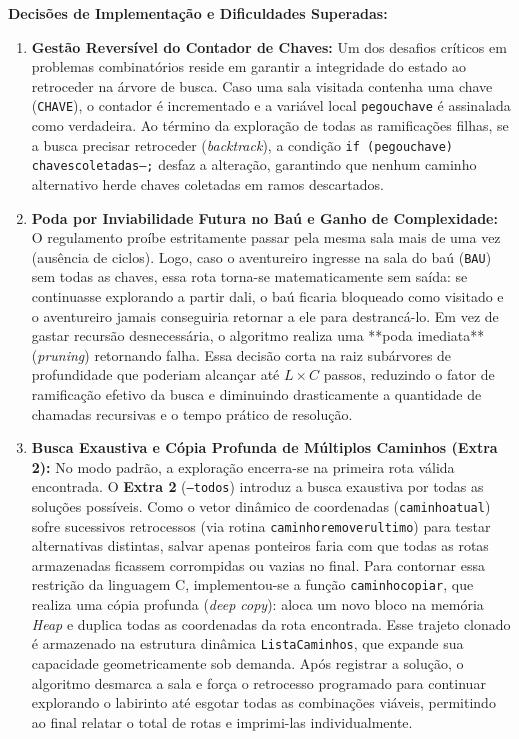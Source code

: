 \documentclass[12pt,a4paper]{article}
\renewcommand{\_}{\textunderscore\allowbreak}
\begin{document}
\textbf{Decisões de Implementação e Dificuldades Superadas:}
\begin{enumerate}
    \item \textbf{Gestão Reversível do Contador de Chaves:} Um dos desafios críticos em problemas combinatórios reside em garantir a integridade do estado ao retroceder na árvore de busca. Caso uma sala visitada contenha uma chave (\texttt{CHAVE}), o contador é incrementado e a variável local \texttt{pegou\_chave} é assinalada como verdadeira. Ao término da exploração de todas as ramificações filhas, se a busca precisar retroceder (\textit{backtrack}), a condição \texttt{if (pegou\_chave) chaves\_coletadas--;} desfaz a alteração, garantindo que nenhum caminho alternativo herde chaves coletadas em ramos descartados.
    \item \textbf{Poda por Inviabilidade Futura no Baú e Ganho de Complexidade:} O regulamento proíbe estritamente passar pela mesma sala mais de uma vez (ausência de ciclos). Logo, caso o aventureiro ingresse na sala do baú (\texttt{BAU}) sem todas as chaves, essa rota torna-se matematicamente sem saída: se continuasse explorando a partir dali, o baú ficaria bloqueado como visitado e o aventureiro jamais conseguiria retornar a ele para destrancá-lo. Em vez de gastar recursão desnecessária, o algoritmo realiza uma **poda imediata** (\textit{pruning}) retornando falha. Essa decisão corta na raiz subárvores de profundidade que poderiam alcançar até $L \times C$ passos, reduzindo o fator de ramificação efetivo da busca e diminuindo drasticamente a quantidade de chamadas recursivas e o tempo prático de resolução.
    \item \textbf{Busca Exaustiva e Cópia Profunda de Múltiplos Caminhos (Extra 2):} No modo padrão, a exploração encerra-se na primeira rota válida encontrada. O \textbf{Extra 2} (\texttt{--todos}) introduz a busca exaustiva por todas as soluções possíveis. Como o vetor dinâmico de coordenadas (\texttt{caminho\_atual}) sofre sucessivos retrocessos (via rotina \texttt{caminho\_remover\_ultimo}) para testar alternativas distintas, salvar apenas ponteiros faria com que todas as rotas armazenadas ficassem corrompidas ou vazias no final. Para contornar essa restrição da linguagem C, implementou-se a função \texttt{caminho\_copiar}, que realiza uma cópia profunda (\textit{deep copy}): aloca um novo bloco na memória \textit{Heap} e duplica todas as coordenadas da rota encontrada. Esse trajeto clonado é armazenado na estrutura dinâmica \texttt{ListaCaminhos}, que expande sua capacidade geometricamente sob demanda. Após registrar a solução, o algoritmo desmarca a sala e força o retrocesso programado para continuar explorando o labirinto até esgotar todas as combinações viáveis, permitindo ao final relatar o total de rotas e imprimi-las individualmente.
\end{enumerate}
\end{document}
